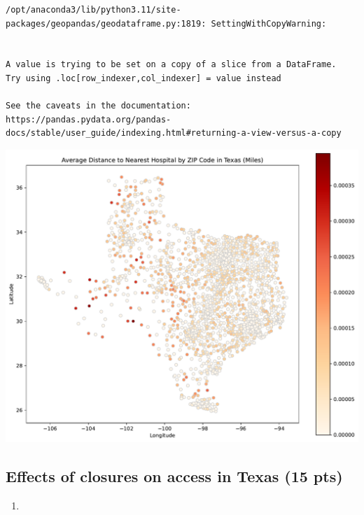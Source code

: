 \documentclass[
  letterpaper,
  DIV=11,
  numbers=noendperiod]{scrartcl}
\providecommand{\tightlist}{%
  \setlength{\itemsep}{0pt}\setlength{\parskip}{0pt}}\usepackage{longtable,booktabs,array}
\begin{document}
\begin{verbatim}
/opt/anaconda3/lib/python3.11/site-packages/geopandas/geodataframe.py:1819: SettingWithCopyWarning:


A value is trying to be set on a copy of a slice from a DataFrame.
Try using .loc[row_indexer,col_indexer] = value instead

See the caveats in the documentation: https://pandas.pydata.org/pandas-docs/stable/user_guide/indexing.html#returning-a-view-versus-a-copy
\end{verbatim}

\includegraphics{pset4_template_files/figure-pdf/cell-21-output-2.pdf}

\subsection{Effects of closures on access in Texas (15
pts)}\label{effects-of-closures-on-access-in-texas-15-pts}

\begin{enumerate}
\def\labelenumi{\arabic{enumi}.}
\tightlist
\item
\end{enumerate}
\end{document}
